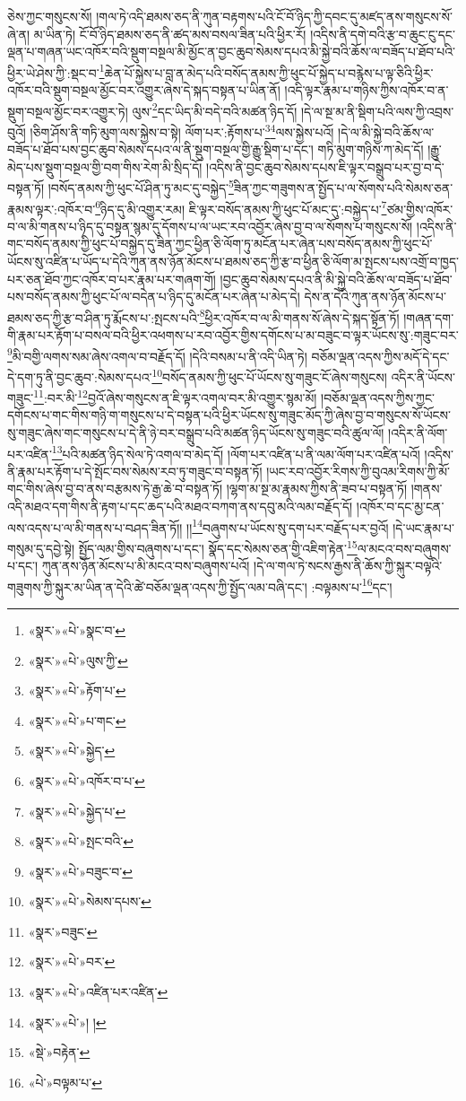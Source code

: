 ཅེས་ཀྱང་གསུངས་སོ། །གལ་ཏེ་འདི་ཐམས་ཅད་ནི་ཀུན་བརྟགས་པའི་ངོ་བོ་ཉིད་ཀྱི་དབང་དུ་མཛད་ནས་གསུངས་སོ་ཞེ་ན། མ་ཡིན་ཏེ། ངོ་བོ་ཉིད་ཐམས་ཅད་ནི་ཚད་མས་བསལ་ཟིན་པའི་ཕྱིར་རོ། །འདིས་ནི་དགེ་བའི་རྩ་བ་ཆུང་ངུ་དང་ལྡན་པ་གཞན་ཡང་འཁོར་བའི་སྡུག་བསྔལ་མི་མྱོང་ན་བྱང་ཆུབ་སེམས་དཔའ་མི་སྐྱེ་བའི་ཆོས་ལ་བཟོད་པ་ཐོབ་པའི་ཕྱིར་ཡེ་ཤེས་ཀྱི་:སྡང་བ་\footnote{«སྣར་»«པེ་»སྣང་བ་}ཆེན་པོ་སྐྱེས་པ་བླ་ན་མེད་པའི་བསོད་ནམས་ཀྱི་ཕུང་པོ་སྐྱེད་པ་བརྙེས་པ་ལྟ་ཅིའི་ཕྱིར་འཁོར་བའི་སྡུག་བསྔལ་མྱོང་བར་འགྱུར་ཞེས་དེ་སྐད་བསྟན་པ་ཡིན་ནོ། །འདི་ལྟར་རྣམ་པ་གཉིས་ཀྱིས་འཁོར་བ་ན་སྡུག་བསྔལ་མྱོང་བར་འགྱུར་ཏེ། ལུས་\footnote{«སྣར་»«པེ་»ལུས་ཀྱི་}དང་ཡིད་མི་བདེ་བའི་མཚན་ཉིད་དོ། །དེ་ལ་སྔ་མ་ནི་སྡིག་པའི་ལས་ཀྱི་འབྲས་བུའོ། །ཅིག་ཤོས་ནི་གཏི་མུག་ལས་སྐྱེས་བ་སྟེ། ལོག་པར་:རྟོགས་པ་\footnote{«སྣར་»«པེ་»རྟོག་པ་}\footnote{«སྣར་»«པེ་»པ་གང་}ལས་སྐྱེས་པའོ། །དེ་ལ་མི་སྐྱེ་བའི་ཆོས་ལ་བཟོད་པ་ཐོབ་པས་བྱང་ཆུབ་སེམས་དཔའ་ལ་ནི་སྡུག་བསྔལ་གྱི་རྒྱུ་སྡིག་པ་དང་། གཏི་མུག་གཉིས་ཀ་མེད་དོ། །རྒྱུ་མེད་པས་སྡུག་བསྔལ་གྱི་བག་གིས་རེག་མི་སྲིད་དོ། །འདིས་ནི་བྱང་ཆུབ་སེམས་དཔས་ཇི་ལྟར་བསྒྲུབ་པར་བྱ་བ་དེ་བསྟན་ཏོ། །བསོད་ནམས་ཀྱི་ཕུང་པོ་ཤིན་ཏུ་མང་དུ་བསྐྱེད་\footnote{«སྣར་»«པེ་»སྐྱེད་}ཟིན་ཀྱང་གཟུགས་ན་སྤྱོད་པ་ལ་སོགས་པའི་སེམས་ཅན་རྣམས་ལྟར་:འཁོར་བ་\footnote{«སྣར་»«པེ་»འཁོར་བ་པ་}ཉིད་དུ་མི་འགྱུར་རམ། ཇི་ལྟར་བསོད་ནམས་ཀྱི་ཕུང་པོ་མང་དུ་:བསྐྱེད་པ་\footnote{«སྣར་»«པེ་»སྐྱེད་པ་}ཙམ་གྱིས་འཁོར་བ་ལ་མི་གནས་པ་ཉིད་དུ་བསྟན་སྙམ་དུ་དོགས་པ་ལ་ཡང་རབ་འབྱོར་ཞེས་བྱ་བ་ལ་སོགས་པ་གསུངས་སོ། །འདིས་ནི་གང་བསོད་ནམས་ཀྱི་ཕུང་པོ་བསྐྱེད་དུ་ཟིན་ཀྱང་ཕྱིན་ཅི་ལོག་ཏུ་མངོན་པར་ཞེན་པས་བསོད་ནམས་ཀྱི་ཕུང་པོ་ཡོངས་སུ་འཛིན་པ་ཡོད་པ་དེའི་ཀུན་ནས་ཉོན་མོངས་པ་ཐམས་ཅད་ཀྱི་རྩ་བ་ཕྱིན་ཅི་ལོག་མ་སྤངས་པས་འགྲོ་བ་ཁྱད་པར་ཅན་ཐོབ་ཀྱང་འཁོར་བ་པར་རྣམ་པར་གཞག་གོ། །བྱང་ཆུབ་སེམས་དཔའ་ནི་མི་སྐྱེ་བའི་ཆོས་ལ་བཟོད་པ་ཐོབ་པས་བསོད་ནམས་ཀྱི་ཕུང་པོ་ལ་བདེན་པ་ཉིད་དུ་མངོན་པར་ཞེན་པ་མེད་དེ། དེས་ན་དེའི་ཀུན་ནས་ཉོན་མོངས་པ་ཐམས་ཅད་ཀྱི་རྩ་བ་ཤིན་ཏུ་རྨོངས་པ་:སྤངས་པའི་\footnote{«སྣར་»«པེ་»སྤང་བའི་}ཕྱིར་འཁོར་བ་ལ་མི་གནས་སོ་ཞེས་དེ་སྐད་སྟོན་ཏོ། །གཞན་དག་གི་རྣམ་པར་རྟོག་པ་བསལ་བའི་ཕྱིར་འཕགས་པ་རབ་འབྱོར་གྱིས་དགོངས་པ་མ་བཟུང་བ་ལྟར་ཡོངས་སུ་:གཟུང་བར་\footnote{«སྣར་»«པེ་»བཟུང་བ་}མི་བགྱི་ལགས་སམ་ཞེས་འགལ་བ་བརྗོད་དོ། །དེའི་བསམ་པ་ནི་འདི་ཡིན་ཏེ། བཅོམ་ལྡན་འདས་ཀྱིས་མདོ་དེ་དང་དེ་དག་ཏུ་ནི་བྱང་ཆུབ་:སེམས་དཔའ་\footnote{«སྣར་»«པེ་»སེམས་དཔས་}བསོད་ནམས་ཀྱི་ཕུང་པོ་ཡོངས་སུ་གཟུང་ངོ་ཞེས་གསུངས། འདིར་ནི་ཡོངས་གཟུང་\footnote{«སྣར་»བཟུང་}:བར་མི་\footnote{«སྣར་»«པེ་»བར་}བྱའོ་ཞེས་གསུངས་ན་ཇི་ལྟར་འགལ་བར་མི་འགྱུར་སྙམ་མོ། །བཅོམ་ལྡན་འདས་ཀྱིས་ཀྱང་དགོངས་པ་གང་གིས་གཉི་ག་གསུངས་པ་དེ་བསྟན་པའི་ཕྱིར་ཡོངས་སུ་གཟུང་མོད་ཀྱི་ཞེས་བྱ་བ་གསུངས་སོ་ཡོངས་སུ་གཟུང་ཞེས་གང་གསུངས་པ་དེ་ནི་ཉེ་བར་བསྒྲུབ་པའི་མཚན་ཉིད་ཡོངས་སུ་གཟུང་བའི་ཚུལ་ལོ། །འདིར་ནི་ལོག་པར་འཛིན་\footnote{«སྣར་»«པེ་»འཛིན་པར་འཛིན་}པའི་མཚན་ཉིད་སེལ་ཏེ་འགལ་བ་མེད་དོ། །ལོག་པར་འཛིན་པ་ནི་ལམ་ལོག་པར་འཛིན་པའོ། །འདིས་ནི་རྣམ་པར་རྟོག་པ་དེ་སྤོང་བས་སེམས་རབ་ཏུ་གཟུང་བ་བསྟན་ཏོ། །ཡང་རབ་འབྱོར་རིགས་ཀྱི་བུའམ་རིགས་ཀྱི་མོ་གང་གིས་ཞེས་བྱ་བ་ནས་བརྩམས་ཏེ་རྒྱ་ཆེ་བ་བསྟན་ཏོ། །ལྷག་མ་སྔ་མ་རྣམས་ཀྱིས་ནི་ཟབ་པ་བསྟན་ཏོ། །གནས་འདི་མཐའ་དག་གིས་ནི་རྟག་པ་དང་ཆད་པའི་མཐའ་བཀག་ནས་དབུ་མའི་ལམ་བརྗོད་དོ། །འཁོར་བ་དང་མྱ་ངན་ལས་འདས་པ་ལ་མི་གནས་པ་བཤད་ཟིན་ཏོ།། །།\footnote{«སྣར་»«པེ་»། །}བཞུགས་པ་ཡོངས་སུ་དག་པར་བརྗོད་པར་བྱའོ། །དེ་ཡང་རྣམ་པ་གསུམ་དུ་དབྱེ་སྟེ། སྤྱོད་ལམ་གྱིས་བཞུགས་པ་དང་། སྣོད་དང་སེམས་ཅན་གྱི་འཇིག་རྟེན་\footnote{«སྡེ་»བརྟེན་}ལ་མངའ་བས་བཞུགས་པ་དང་། ཀུན་ནས་ཉོན་མོངས་པ་མི་མངའ་བས་བཞུགས་པའོ། །དེ་ལ་གལ་ཏེ་སངས་རྒྱས་ནི་ཆོས་ཀྱི་སྐུར་བལྟའི་གཟུགས་ཀྱི་སྐུར་མ་ཡིན་ན་དེའི་ཚེ་བཅོམ་ལྡན་འདས་ཀྱི་སྤྱོད་ལམ་བཞི་དང་། :བལྟམས་པ་\footnote{«པེ་»བལྟམ་པ་}དང་། 